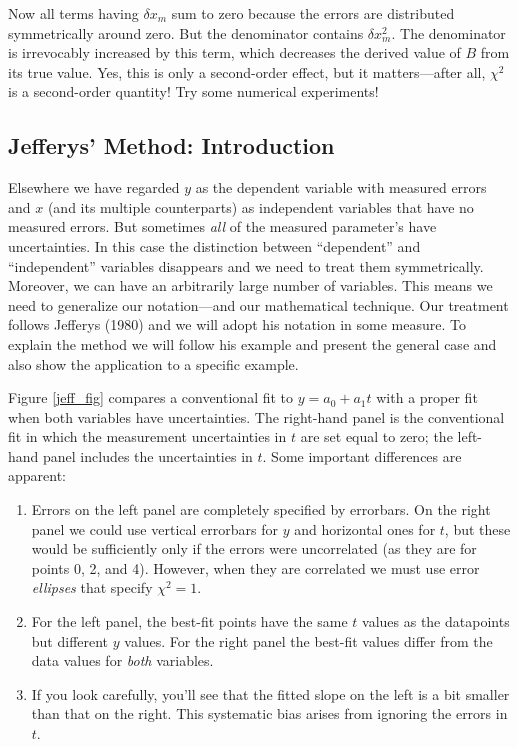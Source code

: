 \documentclass[psfig,preprint]{aastex}
\begin{document}
	Now all terms having $\delta x_m$ sum to zero because the errors
are distributed symmetrically around zero. But the denominator contains
$\delta x_m^2$. The denominator is irrevocably increased by this term,
which decreases the derived value of $B$ from its true value. Yes, this
is only a second-order effect, but it matters---after all, $\chi^2$ is a
second-order quantity! Try some numerical experiments!

\subsection{Jefferys' Method: Introduction}

Elsewhere we have regarded $y$ as the dependent variable with measured
errors and $x$ (and its multiple counterparts) as independent variables
that have no measured errors.  But sometimes {\it all} of the measured
parameter's have uncertainties.  In this case the distinction between
``dependent'' and ``independent'' variables disappears and we need to
treat them symmetrically.  Moreover, we can have an arbitrarily large
number of variables.  This means we need to generalize our
notation---and our mathematical technique. 
Our treatment follows Jefferys (1980) and we will adopt his notation in some
measure. To explain the method we will follow his example and present
the general case and also show the application to a specific example. 

Figure \ref{jeff_fig} compares a conventional fit to $y=a_0 + a_1t$ with
a proper fit when both variables have uncertainties.  The right-hand
panel is the conventional fit in which the measurement uncertainties in
$t$ are set equal to zero;  the left-hand panel includes the
uncertainties in $t$. Some important differences are apparent:
\begin{enumerate}

\item Errors on the left panel are completely specified by errorbars. 
On the right panel we could use vertical errorbars for $y$ and
horizontal ones for $t$, but these would be sufficiently only if the
errors were uncorrelated (as they are for points 0, 2, and 4).  However,
when they are correlated we must use error {\it ellipses} that specify
$\chi^2=1$. 


\item For the left panel, the best-fit points have the same $t$ values
as the datapoints but different $y$ values.  For the right panel the
best-fit values differ from the data values for {\it both} variables. 

\item If you look carefully, you'll see that the fitted slope on the left is a
bit smaller than that on the right. This systematic bias 
arises from ignoring the errors in $t$.
\end{enumerate}
\end{document}
